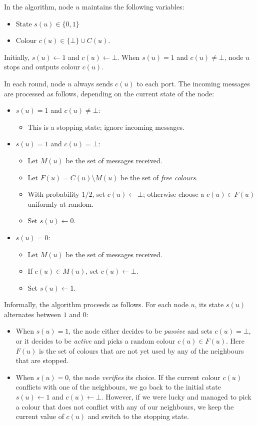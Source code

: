 In the algorithm, node $u$ maintains the following variables:
\begin{itemize}[noitemsep]
    \item State $s(u) \in \{0,1\}$
    \item Colour $c(u) \in \{\bot\} \cup C(u)$.
\end{itemize}
Initially, $s(u) \gets 1$ and $c(u) \gets \bot$. When $s(u) = 1$ and $c(u) \ne \bot$, node $u$ stops and outputs colour $c(u)$.

In each round, node $u$ always sends $c(u)$ to each port. The incoming messages are processed as follows, depending on the current state of the node:
\begin{itemize}
    \item $s(u) = 1$ and $c(u) \ne \bot$:
    \begin{itemize}
        \item This is a stopping state; ignore incoming messages.
    \end{itemize}
    \item $s(u) = 1$ and $c(u) = \bot$:
    \begin{itemize}
        \item Let $M(u)$ be the set of messages received.
        \item Let $F(u) = C(u) \setminus M(u)$ be the set of \emph{free colours}.
        \item With probability $1/2$, set $c(u) \gets \bot$; otherwise choose a $c(u) \in F(u)$ uniformly at random.
        \item Set $s(u) \gets 0$.
    \end{itemize}
    \item $s(u) = 0$:
    \begin{itemize}
        \item Let $M(u)$ be the set of messages received.
        \item If $c(u) \in M(u)$, set $c(u) \gets \bot$.
        \item Set $s(u) \gets 1$.
    \end{itemize}
\end{itemize}

Informally, the algorithm proceeds as follows. For each node $u$, its state $s(u)$ alternates between $1$ and $0$:
\begin{itemize}
    \item When $s(u) = 1$, the node either decides to be \emph{passive} and sets $c(u) = \bot$, or it decides to be \emph{active} and picks a random colour $c(u) \in F(u)$. Here $F(u)$ is the set of colours that are not yet used by any of the neighbours that are stopped.
    \item When $s(u) = 0$, the node \emph{verifies} its choice. If the current colour $c(u)$ conflicts with one of the neighbours, we go back to the initial state $s(u) \gets 1$ and $c(u) \gets \bot$. However, if we were lucky and managed to pick a colour that does not conflict with any of our neighbours, we keep the current value of $c(u)$ and switch to the stopping state.
\end{itemize}



